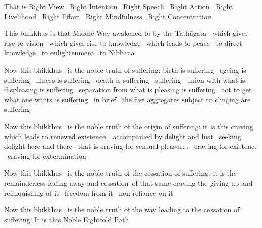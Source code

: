 \begin{english-only-hang}
  That is Right View \breathmark\ Right Intention \breathmark\ Right Speech \breathmark\ Right Action \breathmark\ Right Livelihood \breathmark\ Right Effort \breathmark\ Right Mindfulness \breathmark\ Right Concentration
\end{english-only-hang}

\begin{english-only-hang}
  This bhikkhus is that Middle Way awakened to by the Tathāgata \breathmark\ which gives rise to vision \breathmark\ which gives rise to knowledge \breathmark\ which leads to peace \breathmark\ to direct knowledge \breathmark\ to enlightenment \breathmark\ to Nibbāna
\end{english-only-hang}

\begin{english-only-hang}
  Now this bhikkhus \breathmark\ is the noble truth of suffering: birth is suffering \breathmark\ ageing is suffering \breathmark\ illness is suffering \breathmark\ death is \ifbfiveversion \mbox{suffering}~ \else suffering \breathmark\ \fi union with what is displeasing is suffering \breathmark\ separation from what is pleasing is suffering \breathmark\ not to get what one wants is suffering \breathmark\ in brief \breathmark\ the five aggregates subject to clinging are suffering
\end{english-only-hang}

\begin{english-only-hang}
  Now this bhikkhus \breathmark\ is the noble truth of the origin of suffering: it is this craving  which leads to renewed \mbox{existence}~\breathmark\ accompanied by delight and lust \breathmark\ seeking delight here and there \breathmark\ that is craving for sensual pleasures \breathmark\ craving for existence \breathmark\ craving for extermination
\end{english-only-hang}

\begin{english-only-hang}
  Now this bhikkhus \breathmark\ is the noble truth of the cessation of suffering: it is the remainderless fading away and cessation\breathmark\ of that same craving the giving up and relinquishing of it \breathmark\ freedom from it \breathmark\ non-reliance on it
\end{english-only-hang}

\begin{english-only-hang}
  Now this bhikkhus \breathmark\ is the noble truth of the way leading to the cessation of suffering: It is this Noble Eightfold Path
\end{english-only-hang}

